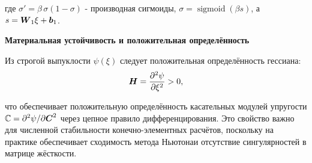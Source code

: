 где $\sigma' = \beta\,\sigma(1-\sigma)$ - производная сигмоиды, 
$\sigma=\operatorname{sigmoid}(\beta s)$, а $s=\boldsymbol{W}_1\xi+\boldsymbol{b}_1$.

\textbf{Материальная устойчивость и положительная определённость}


Из строгой выпуклости \(\psi(\xi)\) следует положительная определённость гессиана:
\begin{equation}
 \boldsymbol{H} = \frac{\partial^2\psi}{\partial\xi^2} > 0,
\label{eq:positive_hessian}
\end{equation}

что обеспечивает положительную определённость касательных модулей упругости 
$\mathbb{C} = \partial^2\psi/\partial\boldsymbol{C}^2$ через цепное правило дифференцирования. 
Это свойство важно для численной стабильности конечно-элементных расчётов, 
поскольку на практике обеспечивает сходимость метода Ньютонаи отсутствие сингулярностей в матрице жёсткости.






